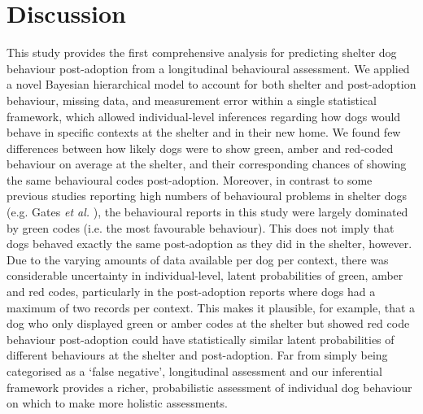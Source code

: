 \documentclass[fleqn,10pt]{wlscirep}
\begin{document}
\section*{Discussion}
This study provides the first comprehensive analysis for predicting shelter dog behaviour post-adoption from a longitudinal behavioural assessment. We applied a novel Bayesian hierarchical model to account for both shelter and post-adoption behaviour, missing data, and measurement error within a single statistical framework, which allowed individual-level inferences regarding how dogs would behave in specific contexts at the shelter and in their new home. We found few differences between how likely dogs were to show green, amber and red-coded behaviour on average at the shelter, and their corresponding chances of showing the same behavioural codes post-adoption. Moreover, in contrast to some previous studies reporting high numbers of behavioural problems in shelter dogs (e.g. Gates \textit{et al.} \cite{gates2018}), the behavioural reports in this study were largely dominated by green codes (i.e. the most favourable behaviour). This does not imply that dogs behaved exactly the same post-adoption as they did in the shelter, however. Due to the varying amounts of data available per dog per context, there was considerable uncertainty in individual-level, latent probabilities of green, amber and red codes, particularly in the post-adoption reports where dogs had a maximum of two records per context. This makes it plausible, for example, that a dog who only displayed green or amber codes at the shelter but showed red code behaviour post-adoption could have statistically similar latent probabilities of different behaviours at the shelter and post-adoption. Far from simply being categorised as a `false negative', longitudinal assessment and our inferential framework provides a richer, probabilistic assessment of individual dog behaviour on which to make more holistic assessments.
\end{document}
